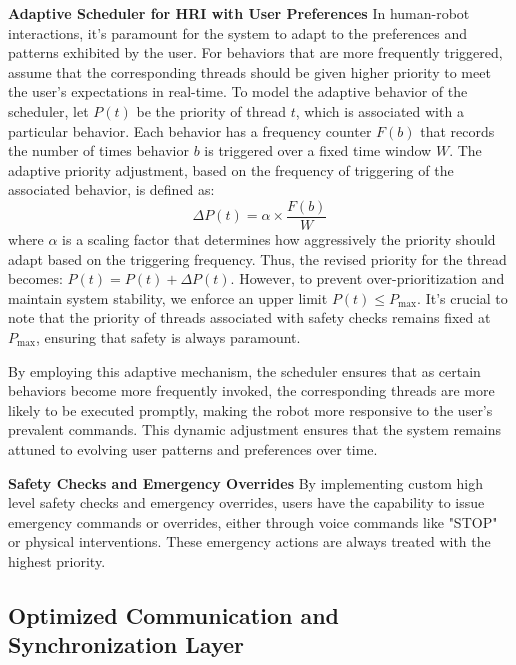 \documentclass[runningheads]{llncs}
\begin{document}
\vspace{0.5cm}
\noindent\textbf{Adaptive Scheduler for HRI with User Preferences}
In human-robot interactions, it's paramount for the system to adapt to the preferences and patterns exhibited by the user. For behaviors that are more frequently triggered, assume that the corresponding threads should be given higher priority to meet the user's expectations in real-time. To model the adaptive behavior of the scheduler, let \( P(t) \) be the priority of thread \( t \), which is associated with a particular behavior. Each behavior has a frequency counter \( F(b) \) that records the number of times behavior \( b \) is triggered over a fixed time window \( W \). 
The adaptive priority adjustment, based on the frequency of triggering of the associated behavior, is defined as:
\begin{equation}
\Delta P(t) = \alpha \times \frac{F(b)}{W}
\end{equation}
where \( \alpha \) is a scaling factor that determines how aggressively the priority should adapt based on the triggering frequency.
Thus, the revised priority for the thread becomes: $P(t) = P(t) + \Delta P(t)$.
However, to prevent over-prioritization and maintain system stability, we enforce an upper limit $
P(t) \leq P_{\text{max}}$.
It's crucial to note that the priority of threads associated with safety checks remains fixed at \( P_{\text{max}} \), ensuring that safety is always paramount.

By employing this adaptive mechanism, the scheduler ensures that as certain behaviors become more frequently invoked, the corresponding threads are more likely to be executed promptly, making the robot more responsive to the user's prevalent commands. This dynamic adjustment ensures that the system remains attuned to evolving user patterns and preferences over time.

\vspace{0.5cm}
\noindent\textbf{Safety Checks and Emergency Overrides}
By implementing custom high level safety checks and emergency overrides, users have the capability to issue emergency commands or overrides, either through voice commands like "STOP" or physical interventions. These emergency actions are always treated with the highest priority. 

\subsection{Optimized Communication and Synchronization Layer}
\end{document}
